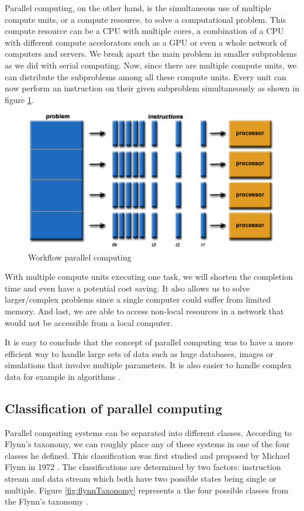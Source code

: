 \documentclass[a4paper, 11pt]{report}
\begin{document}
Parallel computing, on the other hand, is the simultaneous use of multiple compute units, or a compute resource, to solve a computational problem. This compute resource can be a CPU with multiple cores, a combination of a CPU with different compute accelorators such as a GPU or even a whole network of computers and servers. We break apart the main problem in smaller subproblems as we did with serial computing. Now, since there are multiple compute units, we can distribute the subproblems among all these compute units. Every unit can now perform an instruction on their given subproblem simultaneously as shown in figure \ref{fig:ParallelC}.
	\begin{figure}[ht]
		\centering
		\includegraphics[scale=.4]{images/parallelProblem.pdf}
		\caption{Workflow parallel computing}
		\label{fig:ParallelC}
	\end{figure}
With multiple compute units executing one task, we will shorten the completion time and even have a potential cost saving. It also allows us to solve larger/complex problems since a single computer could suffer from limited memory. And last, we are able to access non-local resources in a network that would not be accessible from a local computer.

It is easy to conclude that the concept of parallel computing was to have a more efficient way to handle large sets of data such as huge databases, images or simulations that involve multiple parameters. It is also easier to handle complex data for example in algorithms \cite{barney2012parallel}.

	\subsection{Classification of parallel computing}
Parallel computing systems can be separated into different classes. According to Flynn's taxonomy, we can roughly place any of these systems in one of the four classes he defined. This classification was first studied and proposed by Michael Flynn in 1972 \cite{Unit2COPC}. The classifications are determined by two factors: instruction stream and data stream which both have two possible states being single or multiple. Figure \ref{fig:flynnTaxonomy} represents a the four possible classes from the Flynn's taxonomy \cite{barney2012parallel}.
\end{document}
